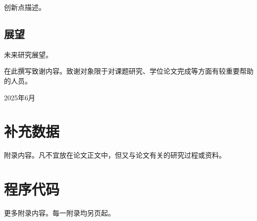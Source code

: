 \documentclass[]{CAUthesis}
\begin{document}
创新点描述。

\section{展望}

未来研究展望。

\backmatter{}

\printbibliography[heading=bibintoc, title={参考文献}]

\begin{acknowledgements}
  在此撰写致谢内容。致谢对象限于对课题研究、学位论文完成等方面有较重要帮助的人员。

  \hfill 2025年6月
\end{acknowledgements}

\appendix

\chapter{补充数据}

附录内容。凡不宜放在论文正文中，但又与论文有关的研究过程或资料。

\chapter{程序代码}

更多附录内容。每一附录均另页起。
\end{document}
